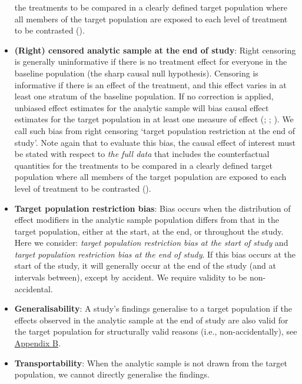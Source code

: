 \documentclass[
  single column]{article}
\begin{document}
\begin{itemize}
  the treatments to be compared in a clearly defined target population
  where all members of the target population are exposed to each level
  of treatment to be contrasted ().
\item
  \textbf{(Right) censored analytic sample at the end of study}: Right
  censoring is generally uninformative if there is no treatment effect
  for everyone in the baseline population (the sharp causal null
  hypothesis). Censoring is informative if there is an effect of the
  treatment, and this effect varies in at least one stratum of the
  baseline population. If no correction is applied, unbiased effect
  estimates for the analytic sample will bias causal effect estimates
  for the target population in at least one measure of effect
  (;
  ;
  ). We call such bias
  from right censoring `target population restriction at the end of
  study'. Note again that to evaluate this bias, the causal effect of
  interest must be stated with respect to \emph{the full data} that
  includes the counterfactual quantities for the treatments to be
  compared in a clearly defined target population where all members of
  the target population are exposed to each level of treatment to be
  contrasted ().
\item
  \textbf{Target population restriction bias}: Bias occurs when the
  distribution of effect modifiers in the analytic sample population
  differs from that in the target population, either at the start, at
  the end, or throughout the study. Here we consider: \emph{target
  population restriction bias at the start of study} and \emph{target
  population restriction bias at the end of study}. If this bias occurs
  at the start of the study, it will generally occur at the end of the
  study (and at intervals between), except by accident. We require
  validity to be non-accidental.
\item
  \textbf{Generalisability}: A study's findings generalise to a target
  population if the effects observed in the analytic sample at the end
  of study are also valid for the target population for structurally
  valid reasons (i.e., non-accidentally), see
  \hyperref[id-app-b]{Appendix B}.
\item
  \textbf{Transportability}: When the analytic sample is not drawn from
  the target population, we cannot directly generalise the findings.

\end{itemize}
\end{document}

